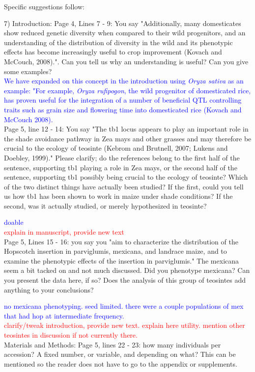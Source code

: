\documentclass[11pt]{article}
\newcommand{\res}[1]{\noindent \textcolor{blue}{{#1}} \\}
\newcommand{\jri}[1]{\noindent \textcolor{red}{{#1}} \\}
\begin{document}
Specific suggestions follow:

7) Introduction:
Page 4, Lines 7 - 9: You say "Additionally, many domesticates show reduced genetic diversity when compared to their wild progenitors, and an understanding of the distribution of diversity in the wild and its phenotypic eﬀects has become increasingly useful to crop improvement (Kovach and McCouch, 2008).".  Can you tell us why an understanding is useful? Can you give some examples?\\

\res{We have expanded on this concept in the introduction using \emph{Oryza sativa} as an example: "For example, \emph{Oryza rufipogon}, the wild progenitor of domesticated rice, has proven useful for the integration of a number of beneficial QTL controlling traits such as grain size and flowering time into domesticated rice (Kovach and McCouch 2008).}

Page 5, line 12 - 14: You say "The tb1 locus appears to play an important role in the shade avoidance pathway in Zea mays and other grasses and may therefore be crucial to the ecology of teosinte (Kebrom and Brutnell, 2007; Lukens and Doebley, 1999)." Please clarify; do the references belong to the first half of the sentence, supporting tb1 playing a role in Zea mays, or the second half of the sentence, supporting tb1 possibly being crucial to the ecology of teosinte? Which of the two distinct things have actually been studied? If the first, could you tell us how tb1 has been shown to work in maize under shade conditions? If the second, was it actually studied, or merely hypothesized in teosinte? 

\res{doable}
\jri{explain in manuscript, provide new text}

Page 5, Lines 15 - 16: you say you "aim to characterize the distribution of the Hopscotch insertion in parviglumis, mexicana, and landrace maize, and to examine the phenotypic eﬀects of the insertion in parviglumis."  The mexicana seem a bit tacked on and not much discussed. Did you phenotype mexicana? Can you present the data here, if so? Does the analysis of this group of teosintes add anything to your conclusions? 

\res{no mexicana phenotyping. seed limited. there were a couple populations of mex that had hop at intermediate frequency.}
\jri{clarify/tweak introduction, provide new text. explain here utility. mention other teosintes in discussion if not currently there.}

Materials and Methods:
Page 5, lines 22 - 23: how many individuals per accession? A fixed number, or variable, and depending on what? This can be mentioned so the reader does not have to go to the appendix or supplements. 
\end{document}
